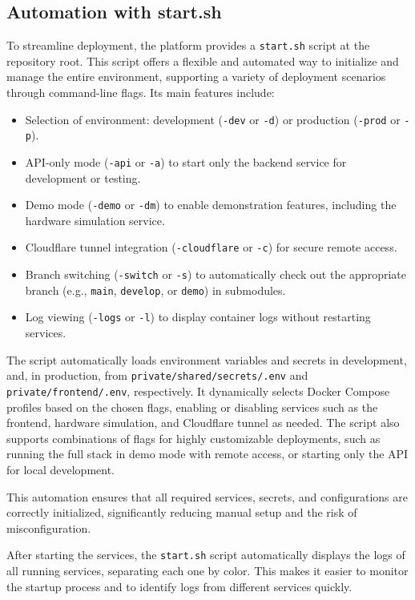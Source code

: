 \subsection{Automation with start.sh} \label{subsec:automation_startsh}

To streamline deployment, the platform provides a \texttt{start.sh} script at the repository root. This script offers a flexible and automated way to initialize and manage the entire environment, supporting a variety of deployment scenarios through command-line flags. Its main features include:
\begin{itemize}
    \item Selection of environment: development (\texttt{-dev} or \texttt{-d}) or production (\texttt{-prod} or \texttt{-p}).
    \item API-only mode (\texttt{-api} or \texttt{-a}) to start only the backend service for development or testing.
    \item Demo mode (\texttt{-demo} or \texttt{-dm}) to enable demonstration features, including the hardware simulation service.
    \item Cloudflare tunnel integration (\texttt{-cloudflare} or \texttt{-c}) for secure remote access.
    \item Branch switching (\texttt{-switch} or \texttt{-s}) to automatically check out the appropriate branch (e.g., \texttt{main}, \texttt{develop}, or \texttt{demo}) in submodules.
    \item Log viewing (\texttt{-logs} or \texttt{-l}) to display container logs without restarting services.
\end{itemize}

The script automatically loads environment variables and secrets in development, and, in production, from \texttt{private/shared/secrets/.env} and \texttt{private/frontend/.env}, respectively. It dynamically selects Docker Compose profiles based on the chosen flags, enabling or disabling services such as the frontend, hardware simulation, and Cloudflare tunnel as needed. The script also supports combinations of flags for highly customizable deployments, such as running the full stack in demo mode with remote access, or starting only the API for local development.

This automation ensures that all required services, secrets, and configurations are correctly initialized, significantly reducing manual setup and the risk of misconfiguration.

After starting the services, the \texttt{start.sh} script automatically displays the logs of all running services, separating each one by color. This makes it easier to monitor the startup process and to identify logs from different services quickly.

